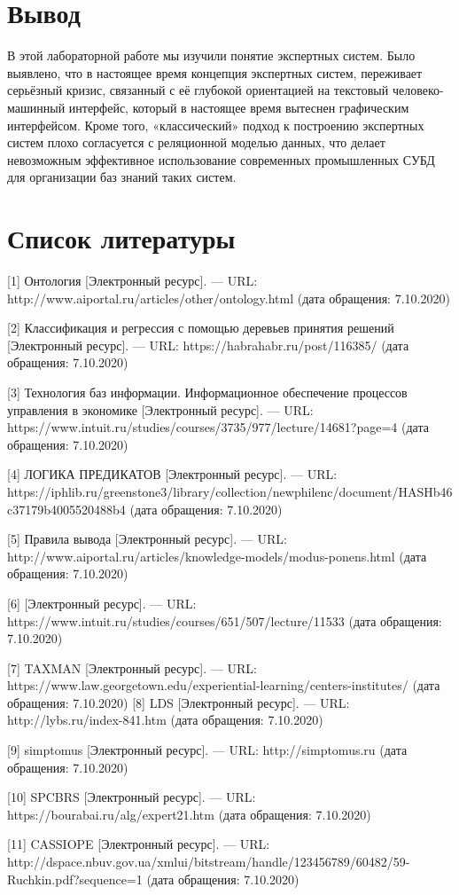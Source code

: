 \documentclass[14pt,a4paper,report]{report}
\begin{document}
\section{Вывод}

В этой лабораторной работе мы изучили понятие экспертных систем. Было выявлено, что в настоящее время концепция экспертных систем, переживает серьёзный кризис, связанный с её глубокой ориентацией на текстовый человеко-машинный интерфейс, который в настоящее время вытеснен графическим интерфейсом. Кроме того, «классический» подход к построению экспертных систем плохо согласуется с реляционной моделью данных, что делает невозможным эффективное использование современных промышленных СУБД для организации баз знаний таких систем.

\clearpage

\section{Список литературы}


\begin{flushleft}

[1] Онтология [Электронный ресурс]. — URL: http://www.aiportal.ru/articles/other/ontology.html (дата обращения: 7.10.2020)

[2] Классификация и регрессия с помощью деревьев принятия решений [Электронный ресурс]. — URL: https://habrahabr.ru/post/116385/ (дата обращения: 7.10.2020)

[3] Технология баз информации. Информационное обеспечение процессов управления в экономике [Электронный ресурс]. — URL: https://www.intuit.ru/studies/courses/3735/977/lecture/14681?page=4 (дата обращения: 7.10.2020)

[4] ЛОГИКА ПРЕДИКАТОВ [Электронный ресурс]. — URL: https://iphlib.ru/greenstone3/library/collection/newphilenc/document/HASHb46c37179b4005520488b4 (дата обращения: 7.10.2020)

[5] Правила вывода [Электронный ресурс]. — URL: http://www.aiportal.ru/articles/knowledge-models/modus-ponens.html (дата обращения: 7.10.2020)


[6]  [Электронный ресурс]. — URL: https://www.intuit.ru/studies/courses/651/507/lecture/11533 (дата обращения: 7.10.2020)

[7] TAXMAN [Электронный ресурс]. — URL: https://www.law.georgetown.edu/experiential-learning/centers-institutes/ (дата обращения: 7.10.2020)
[8] LDS [Электронный ресурс]. — URL: http://lybs.ru/index-841.htm (дата обращения: 7.10.2020)

[9] simptomus [Электронный ресурс]. — URL: http://simptomus.ru (дата обращения: 7.10.2020)

[10] SPCBRS [Электронный ресурс]. — URL: https://bourabai.ru/alg/expert21.htm (дата обращения: 7.10.2020)


[11] CASSIOPE [Электронный ресурс]. — URL: http://dspace.nbuv.gov.ua/xmlui/bitstream/handle/123456789/60482/59-Ruchkin.pdf?sequence=1 (дата обращения: 7.10.2020)



\end{flushleft}
\end{document}
